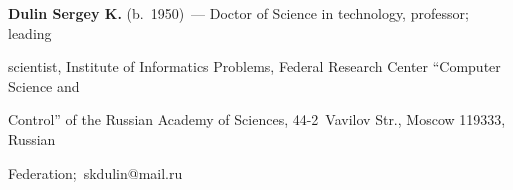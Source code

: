 \textbf{Dulin Sergey K.} (b.\ 1950)~--- Doctor of Science in technology, professor; leading 


scientist, Institute of Informatics Problems, Federal Research Center ``Computer Science and 


Control'' of the Russian Academy of Sciences, 44-2~Vavilov Str., Moscow 119333, Russian 


Federation;~\mbox{skdulin@mail.ru}~


  


\label{end\stat}





\renewcommand{\bibname}{\protect\rm Литература} 


